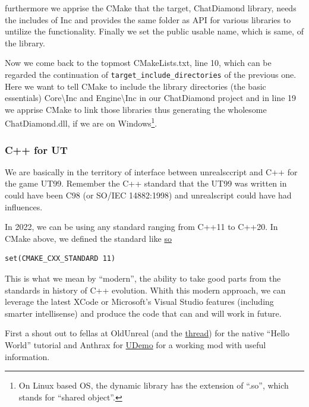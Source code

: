 \documentclass{article}
\theoremstyle{definition}
\newcommand{\FileColor}[1]{{\color{Purple} #1}}
\newcommand{\FolderColor}[1]{{\color{mygray} #1}}
\begin{document}
furthermore we apprise the CMake that the target, ChatDiamond library, needs the includes of \FolderColor{Inc} and provides the same folder as API for various libraries to untilize the functionality.  Finally we set the public usable name, which is same, of the library.

Now we come back to the topmost \FileColor{CMakeLists.txt}, line 10, which can be regarded the continuation of \texttt{target\_include\_directories} of the previous one.  Here we want to tell CMake to include the library directories (the basic essentials) \FolderColor{Core\textbackslash Inc} and \FolderColor{Engine\textbackslash Inc} in our ChatDiamond project and in line 19 we apprise CMake to link those libraries thus generating the wholesome \FileColor{ChatDiamond.dll}, if we are on Windows\footnote{On Linux based OS, the dynamic library has the extension of ``.so'', which stands for ``shared object''.}.

\subsubsection{C++ for UT}
We are basically in the territory of interface between unrealsccript and C++ for the game UT99.  Remember the C++ standard that the UT99 was written in could have been C98 (or SO/IEC 14882:1998) and unrealscript could have had influences.

In 2022, we can be using any standard ranging from C++11 to C++20.  In CMake above, we defined the standard like \href{https://github.com/ravimohan1991/ChatDiamond/blob/f7950b2591b93a54600459ec58d7ddf57fe9218d/UTNativeEssentials/CMakeLists.txt#L11}{so}

\lstset{language=[5.0]Lua}
\begin{lstlisting}[frame=single]
set(CMAKE_CXX_STANDARD 11)
\end{lstlisting}

This is what we mean by ``modern'', the ability to take good parts from the standards in history of C++ evolution.  Whith this modern approach, we can leverage the latest  XCode or Microsoft's Visual Studio features (including smarter intellisense) and produce the code that can and will work in future. 

First a shout out to fellas at OldUnreal (and the \href{https://www.oldunreal.com/phpBB3/viewtopic.php?f=37&t=3938}{thread}) for the native ``Hello World'' tutorial and Anthrax for \href{https://github.com/stijn-volckaert/udemo}{UDemo} for a working mod with useful information.
\end{document}

